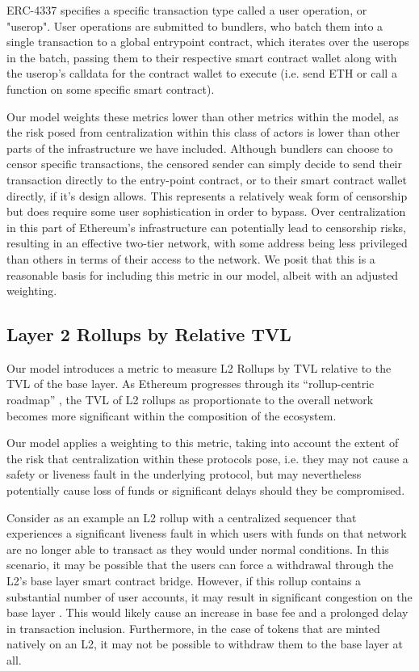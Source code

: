 \documentclass[conference]{IEEEtran}
\begin{document}
ERC-4337 specifies a specific transaction type called a user operation, or "userop".  User operations are submitted to bundlers, who batch them into a single transaction to a global entrypoint contract, which iterates over the userops in the batch, passing them to their respective smart contract wallet along with the userop's calldata for the contract wallet to execute (i.e. send ETH or call a function on some specific smart contract).

Our model weights these metrics lower than other metrics within the model, as the risk posed from centralization within this class of actors is lower than other parts of the infrastructure we have included.  Although bundlers can choose to censor specific transactions, the censored sender can simply decide to send their transaction directly to the entry-point contract, or to their smart contract wallet directly, if it's design allows.  This represents a relatively weak form of censorship but does require some user sophistication in order to bypass. Over centralization in this part of Ethereum's infrastructure can potentially lead to censorship risks, resulting in an effective two-tier network, with some address being less privileged than others in terms of their access to the network. We posit that this is a reasonable basis for including this metric in our model, albeit with an adjusted weighting.

\subsection{Layer 2 Rollups by Relative TVL}

Our model introduces a metric to measure L2 Rollups by TVL relative to the TVL of the base layer.  As Ethereum progresses through its “rollup-centric roadmap” \cite{buterin2020}, the TVL of L2 rollups as proportionate to the overall network becomes more significant within the composition of the ecosystem.

Our model applies a weighting to this metric, taking into account the extent of the risk that centralization within these protocols pose, i.e. they may not cause a safety or liveness fault in the underlying protocol, but may nevertheless potentially cause loss of funds or significant delays should they be compromised.

Consider as an example an L2 rollup with a centralized sequencer that experiences a significant liveness fault in which users with funds on that network are no longer able to transact as they would under normal conditions.  In this scenario, it may be possible that the users can force a withdrawal through the L2's base layer smart contract bridge.  However, if this rollup contains a substantial number of user accounts, it may result in significant congestion on the base layer \cite{gorzny2022ideal}.  This would likely cause an increase in base fee and a prolonged delay in transaction inclusion.  Furthermore, in the case of tokens that are minted natively on an L2, it may not be possible to withdraw them to the base layer at all.
\end{document}
